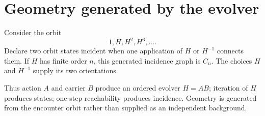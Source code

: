 \section{Geometry generated by the evolver}

Consider the orbit
\[
1,H,H^2,H^3,\ldots .
\]
Declare two orbit states incident when one application of \(H\) or
\(H^{-1}\) connects them. If \(H\) has finite order \(n\), this generated
incidence graph is \(C_n\). The choices \(H\) and \(H^{-1}\) supply its two
orientations.

Thus action \(A\) and carrier \(B\) produce an ordered evolver \(H=AB\);
iteration of \(H\) produces states; one-step reachability produces incidence.
Geometry is generated from the encounter orbit rather than supplied
as an independent background.
